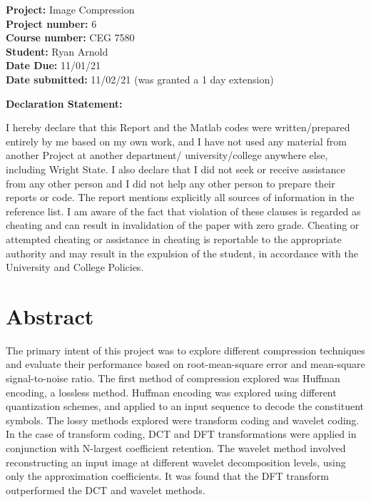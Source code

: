 \documentclass[./rarnold_project6.tex]{subfiles}
\begin{document}


\begin{titlepage}

\noindent
\textbf{Project:} Image Compression \\
\textbf{Project number:} 6\\
\textbf{Course number:} CEG 7580\\
\textbf{Student:} Ryan Arnold \\
\textbf{Date Due:} 11/01/21 \\
\textbf{Date submitted:} 11/02/21 (was granted a 1 day extension)
\vspace{24pt}

\noindent \textbf{Declaration Statement: }

\noindent I hereby declare that this Report and the Matlab codes were written/prepared entirely by me based on my own work, and I have not used any material from another Project at another department/ university/college anywhere else, including Wright State. I also declare that I did not seek or receive assistance from any other person and I did not help any other person to prepare their reports or code.  The report mentions explicitly all sources of information in the reference list. I am aware of the fact that violation of these clauses is regarded as cheating and can result in invalidation of the paper with zero grade. Cheating or attempted cheating or assistance in cheating is reportable to the appropriate authority and may result in the expulsion of the student, in accordance with the University and College Policies.

\end{titlepage}

\clearpage
\section*{Abstract}

\noindent The primary intent of this project was to explore different compression techniques and evaluate their performance based on root-mean-square error and mean-square signal-to-noise ratio.  The first method of compression explored was Huffman encoding, a lossless method.  Huffman encoding was explored using different quantization schemes, and applied to an input sequence to decode the constituent symbols.  The lossy methods explored were transform coding and wavelet coding.  In the case of transform coding, DCT and DFT transformations were applied in conjunction with N-largest coefficient retention.    The wavelet method involved reconstructing an input image at different wavelet decomposition levels, using only the approximation coefficients.  It was found that the DFT transform outperformed the DCT and wavelet methods.
\end{document}
